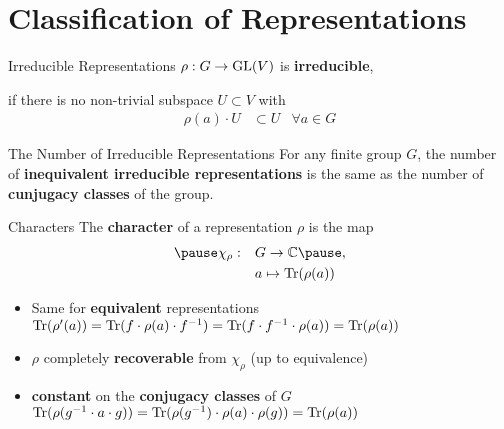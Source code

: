 
\section{Classification of Representations}

\begin{frame}{Irreducible Representations}
    \large
    $\rho: G \to \operatorname{GL}(V)$ is \textbf{irreducible},
    
    \pause
    if there is no non-trivial subspace $U \subset V$ with
    \pause
    \begin{align*}
        \rho(a) \cdot U & \subset U & \forall a \in G
    \end{align*}

    \normalsize
    {\hspace*{\fill} \cite{hein2013}}

\end{frame}

\begin{frame}{The Number of Irreducible Representations}
    For any finite group $G$, the number of \textbf{inequivalent irreducible representations} is the same as the number of \textbf{cunjugacy classes} of the group.

    {\hspace*{\fill} \cite{fulton2013}}
    
\end{frame}

\begin{frame}{Characters}
    \large
    The \textbf{character} of a representation $\rho$ is the map
    \Large
    \begin{align*}
        \pause
        \chi_\rho: \quad & G \to \C \pause , \\
        & a \mapsto \Tr(\rho(a))
    \end{align*}
    
    \pause
    \large
    \begin{itemize}
        \item Same for \textbf{equivalent} representations
            \hspace*{\fill} $\operatorname{Tr}(\rho'(a)) = \operatorname{Tr}(f \cdot \rho(a) \cdot f^{-1}) = \operatorname{Tr}(f \cdot f^{-1} \cdot \rho(a)) = \operatorname{Tr}(\rho(a))$ \pause
        \item $\rho$ completely \textbf{recoverable} from $\chi_\rho$ (up to equivalence) \pause
        \item \textbf{constant} on the \textbf{conjugacy classes} of $G$
            \hspace*{\fill} $\operatorname{Tr}(\rho(g^{-1} \cdot a \cdot g)) = \operatorname{Tr}(\rho(g^{-1}) \cdot \rho(a) \cdot \rho(g)) = \operatorname{Tr}(\rho(a))$
    \end{itemize}

    \normalsize
    {\hspace*{\fill} \cite{fulton2013}}
    
\end{frame}

